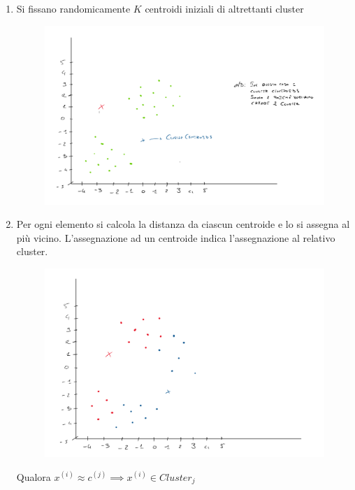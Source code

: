 \begin{enumerate}
  \item Si fissano randomicamente $K$ centroidi iniziali di altrettanti cluster
  \begin{figure}[H]
    \centering
    \includegraphics[width=1\textwidth]{img/kmeans1.PNG}
\end{figure}
  \item Per ogni elemento si calcola la distanza da ciascun centroide e lo si
  assegna al più vicino. L'assegnazione ad un centroide indica l'assegnazione al relativo cluster.
  \begin{figure}[H]
    \centering
    \includegraphics[width=1\textwidth]{img/kmeans2.PNG}
\end{figure}
    \begin{nota}
     Qualora $x^{(i)} \approx c^{(j)} \implies x^{(i)} \in Cluster_j$
    \end{nota}

\end{enumerate}
